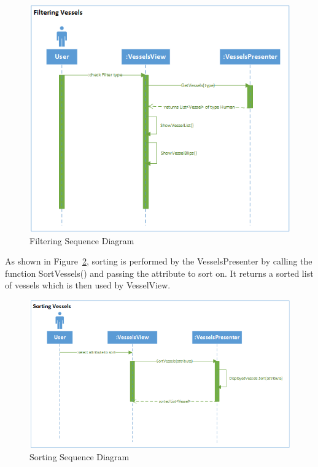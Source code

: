 \documentclass[12pt]{article}
\begin{document}
\begin{figure}[h!]
    \centering
    \includegraphics[scale=1]{2_1_filtering}
    \caption{Filtering Sequence Diagram}
    \label{fig:FilteringSequenceDiagram}
\end{figure}

As shown in Figure~\ref{fig:SortingSequenceDiagram}, sorting is performed by the VesselsPresenter by calling the function SortVessels() and passing the attribute to sort on. It returns a sorted list of vessels which is then used by VesselView.
\clearpage
\begin{figure}[h!]
    \centering
    \includegraphics[scale=1]{2_1_sorting}
    \caption{Sorting Sequence Diagram}
    \label{fig:SortingSequenceDiagram}
\end{figure}
\end{document}
